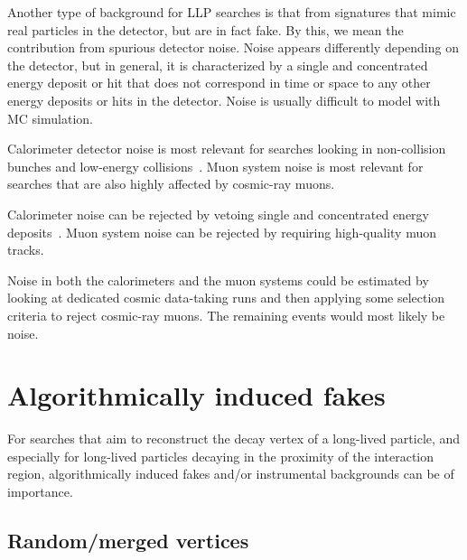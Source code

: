 Another type of background for LLP searches is that from signatures that mimic real particles in the detector, but are in fact fake. By this, we mean the contribution from spurious detector noise. Noise appears differently depending on the detector, but in general, it is characterized by a single and concentrated energy deposit or hit that does not correspond in time or space to any other energy deposits or hits in the detector. Noise is usually difficult to model with MC simulation.

Calorimeter detector noise is most relevant for searches looking in non-collision bunches and low-energy collisions~\cite{Khachatryan:2015jha, Chatrchyan:2012dxa, Khachatryan:2010uf}. Muon system noise is most relevant for searches that are also highly affected by cosmic-ray muons.

Calorimeter noise can be rejected by vetoing single and concentrated energy deposits~\cite{Khachatryan:2015jha, Chatrchyan:2012dxa, Khachatryan:2010uf}. Muon system noise can be rejected by requiring high-quality muon tracks.

Noise in both the calorimeters and the muon systems could be estimated by looking at dedicated cosmic data-taking runs and then applying some selection criteria to reject cosmic-ray muons. The remaining events would most likely be noise.

\section{Algorithmically induced fakes} %

For searches that aim to reconstruct the decay vertex of a long-lived particle, and especially for long-lived particles decaying in the proximity of the interaction region, algorithmically induced fakes and/or instrumental backgrounds can be of importance.

\subsection{Random/merged vertices} %

